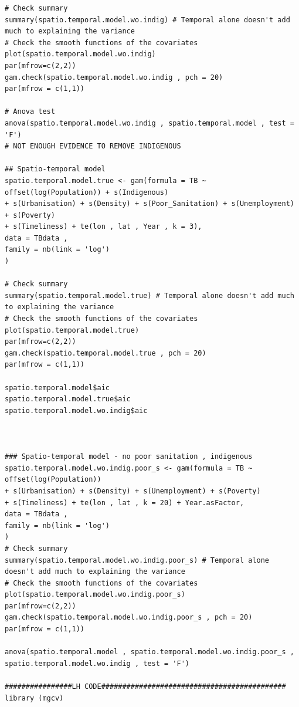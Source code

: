 \documentclass{article}
\begin{document}
\begin{verbatim}
# Check summary
summary(spatio.temporal.model.wo.indig) # Temporal alone doesn't add much to explaining the variance
# Check the smooth functions of the covariates
plot(spatio.temporal.model.wo.indig)
par(mfrow=c(2,2))
gam.check(spatio.temporal.model.wo.indig , pch = 20)
par(mfrow = c(1,1))

# Anova test
anova(spatio.temporal.model.wo.indig , spatio.temporal.model , test = 'F')
# NOT ENOUGH EVIDENCE TO REMOVE INDIGENOUS

## Spatio-temporal model
spatio.temporal.model.true <- gam(formula = TB ~ offset(log(Population)) + s(Indigenous) 
+ s(Urbanisation) + s(Density) + s(Poor_Sanitation) + s(Unemployment) + s(Poverty)
+ s(Timeliness) + te(lon , lat , Year , k = 3),
data = TBdata , 
family = nb(link = 'log')
)

# Check summary
summary(spatio.temporal.model.true) # Temporal alone doesn't add much to explaining the variance
# Check the smooth functions of the covariates
plot(spatio.temporal.model.true)
par(mfrow=c(2,2))
gam.check(spatio.temporal.model.true , pch = 20)
par(mfrow = c(1,1))

spatio.temporal.model$aic
spatio.temporal.model.true$aic
spatio.temporal.model.wo.indig$aic



### Spatio-temporal model - no poor sanitation , indigenous
spatio.temporal.model.wo.indig.poor_s <- gam(formula = TB ~ offset(log(Population))
+ s(Urbanisation) + s(Density) + s(Unemployment) + s(Poverty)
+ s(Timeliness) + te(lon , lat , k = 20) + Year.asFactor,
data = TBdata , 
family = nb(link = 'log')
)
# Check summary
summary(spatio.temporal.model.wo.indig.poor_s) # Temporal alone doesn't add much to explaining the variance
# Check the smooth functions of the covariates
plot(spatio.temporal.model.wo.indig.poor_s)
par(mfrow=c(2,2))
gam.check(spatio.temporal.model.wo.indig.poor_s , pch = 20)
par(mfrow = c(1,1))

anova(spatio.temporal.model , spatio.temporal.model.wo.indig.poor_s , spatio.temporal.model.wo.indig , test = 'F')

################LH CODE############################################
library (mgcv)



\end{verbatim}
\end{document}
